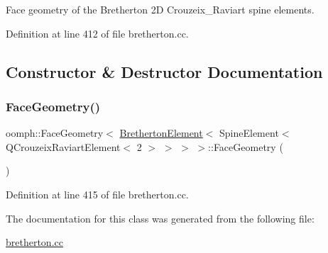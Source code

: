 Face geometry of the Bretherton 2D Crouzeix\+\_\+\+Raviart spine elements. 

Definition at line 412 of file bretherton.\+cc.



\subsection{Constructor \& Destructor Documentation}
\mbox{\label{classoomph_1_1FaceGeometry_3_01BrethertonElement_3_01SpineElement_3_01QCrouzeixRaviartElement_3_012_01_4_01_4_01_4_01_4_a0dc4cbff5cdc502a6f653a6682cf7da5}} 
\subsubsection{\texorpdfstring{Face\+Geometry()}{FaceGeometry()}}
{\footnotesize\ttfamily oomph\+::\+Face\+Geometry$<$ \hyperlink{classBrethertonElement}{Bretherton\+Element}$<$ Spine\+Element$<$ Q\+Crouzeix\+Raviart\+Element$<$ 2 $>$ $>$ $>$ $>$\+::Face\+Geometry (\begin{DoxyParamCaption}{ }\end{DoxyParamCaption})\hspace{0.3cm}{\ttfamily [inline]}}



Definition at line 415 of file bretherton.\+cc.



The documentation for this class was generated from the following file\+:\begin{DoxyCompactItemize}
\item 
\hyperlink{bretherton_8cc}{bretherton.\+cc}\end{DoxyCompactItemize}
